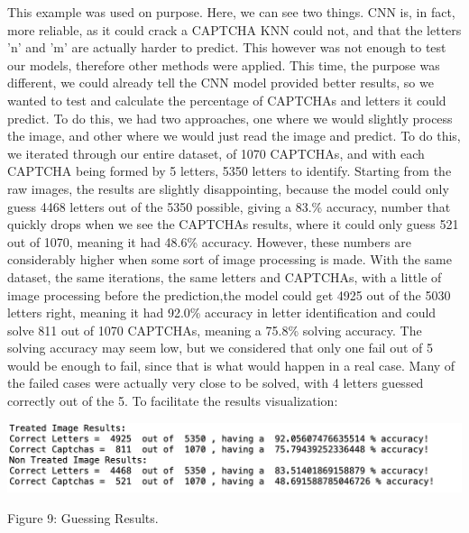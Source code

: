 \documentclass[conference]{IEEEtran}
\begin{document}
This example was used on purpose. Here, we can see two things. CNN is, in fact, more reliable, as it could crack a CAPTCHA KNN could not, and that the letters 'n' and 'm' are actually harder to predict. This however was not enough to test our models, therefore other methods were applied. This time, the purpose was different, we could already tell the CNN model provided better results, so we wanted to test and calculate the percentage of CAPTCHAs and letters it could predict. To do this, we had two approaches, one where we would slightly process the image, and other where we would just read the image and predict. To do this, we iterated through our entire dataset, of 1070 CAPTCHAs, and with each CAPTCHA being formed by 5 letters, 5350 letters to identify. Starting from the raw images, the results are slightly disappointing, because the model could only guess 4468 letters out of the 5350 possible, giving a 83.\% accuracy, number that quickly drops when we see the CAPTCHAs results, where it could only guess 521 out of 1070, meaning it had 48.6\% accuracy. However, these numbers are considerably higher when some sort of image processing is made. With the same dataset, the same iterations, the same letters and CAPTCHAs, with a little of image processing before the prediction,the model could get 4925 out of the 5030 letters right, meaning it had 92.0\% accuracy in letter identification and could solve 811 out of 1070 CAPTCHAs, meaning a 75.8\% solving accuracy. The solving accuracy may seem low, but we considered that only one fail out of 5 would be enough to fail, since that is what would happen in a real case. Many of the failed cases were actually very close to be solved, with 4 letters guessed correctly out of the 5. To facilitate the results visualization:
\begin{center}
\includegraphics[scale=0.375]{newresults.png} 
\caption{Figure 9: Guessing Results.}
\end{center}
\\ \\ \\
\end{document}
